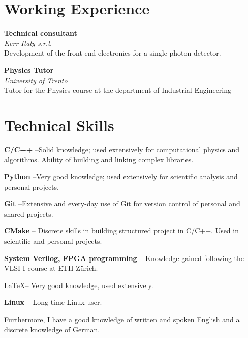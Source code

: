 \documentclass[a4paper,10pt]{article}
\begin{document}
\begin{adjustbox}{valign=t}
\begin{minipage}{0.6\textwidth} %

\section*{Working Experience}
\begin{description}
\raggedright
\item[\normalfont \textcolor{ColorTwo}{Jul. 2021 -- Dec. 2021.}] 
	\textbf{Technical consultant}\\
	
	\emph{Kerr Italy s.r.l.}\\
	\small
	Development of the front-end electronics for a single-photon detector.
	\normalsize
\item[\normalfont \textcolor{ColorTwo}{Feb. 2021 -- Jun. 2021}] 
	\textbf{Physics Tutor}\\
	
	\emph{University of Trento}\\
	\small 
	Tutor for the Physics course at the department of Industrial Engineering
    \normalsize
\end{description}
\section*{Technical Skills}
\begin{description}
\item \textbf{C/C++} --\small  Solid knowledge; used extensively for computational physics and algorithms. Ability of building and linking complex libraries. \normalsize
\item \textbf{Python} --\small Very good knowledge; used extensively for scientific analysis and personal projects.\normalsize
\item \textbf{Git} --\small Extensive and every-day use of Git for version control of personal and shared projects.\normalsize
\item \textbf{CMake} -- \small Discrete skills in building structured project in C/C++. Used in scientific and personal projects.\normalsize
\item \textbf{System Verilog, FPGA programming} -- \small Knowledge gained following the VLSI I course at ETH Zürich.\normalsize
\item \LaTeX -- \small Very good knowledge, used extensively.\normalsize
\item \textbf{Linux} -- \small Long-time Linux user.\normalsize
\end{description}
\small 
Furthermore, I have a good knowledge of written and spoken English and a discrete knowledge of German.
\normalsize

\end{minipage}
\end{adjustbox}
\end{document}
